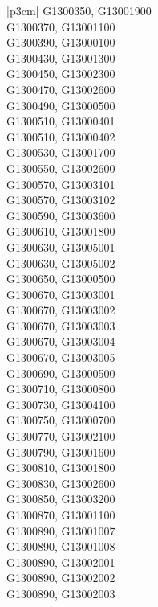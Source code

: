 \begin{customLongTable}{ |p{3cm}| }
G1300350, G13001900 \\ \hline
G1300370, G13001100 \\ \hline
G1300390, G13000100 \\ \hline
G1300430, G13001300 \\ \hline
G1300450, G13002300 \\ \hline
G1300470, G13002600 \\ \hline
G1300490, G13000500 \\ \hline
G1300510, G13000401 \\ \hline
G1300510, G13000402 \\ \hline
G1300530, G13001700 \\ \hline
G1300550, G13002600 \\ \hline
G1300570, G13003101 \\ \hline
G1300570, G13003102 \\ \hline
G1300590, G13003600 \\ \hline
G1300610, G13001800 \\ \hline
G1300630, G13005001 \\ \hline
G1300630, G13005002 \\ \hline
G1300650, G13000500 \\ \hline
G1300670, G13003001 \\ \hline
G1300670, G13003002 \\ \hline
G1300670, G13003003 \\ \hline
G1300670, G13003004 \\ \hline
G1300670, G13003005 \\ \hline
G1300690, G13000500 \\ \hline
G1300710, G13000800 \\ \hline
G1300730, G13004100 \\ \hline
G1300750, G13000700 \\ \hline
G1300770, G13002100 \\ \hline
G1300790, G13001600 \\ \hline
G1300810, G13001800 \\ \hline
G1300830, G13002600 \\ \hline
G1300850, G13003200 \\ \hline
G1300870, G13001100 \\ \hline
G1300890, G13001007 \\ \hline
G1300890, G13001008 \\ \hline
G1300890, G13002001 \\ \hline
G1300890, G13002002 \\ \hline
G1300890, G13002003 \\ \hline

\end{customLongTable}
